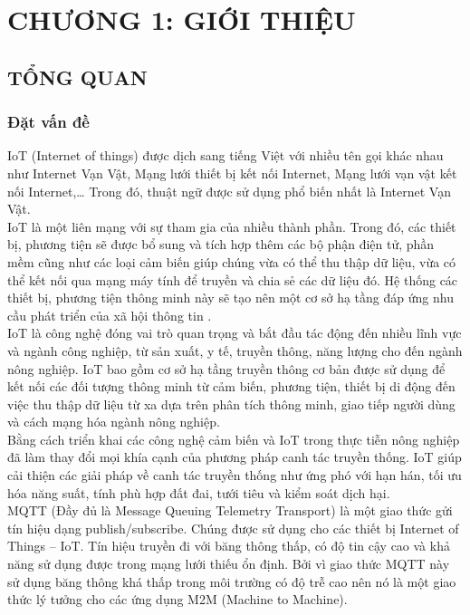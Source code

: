 \section*{CHƯƠNG 1: GIỚI THIỆU}
\setcounter{section}{1}
\subsection{TỔNG QUAN}
\subsubsection{Đặt vấn đề}
IoT (Internet of things) được dịch sang tiếng Việt với nhiều tên gọi khác nhau như Internet Vạn Vật, Mạng lưới thiết bị kết nối Internet, Mạng lưới vạn vật kết nối Internet,… Trong đó, thuật ngữ được sử dụng phổ biến nhất là Internet Vạn Vật.\\
\indent IoT là một liên mạng với sự tham gia của nhiều thành phần. Trong đó, các thiết bị, phương tiện sẽ được bổ sung và tích hợp thêm các bộ phận điện tử, phần mềm cũng như các loại cảm biến giúp chúng vừa có thể thu thập dữ liệu, vừa có thể kết nối qua mạng máy tính để truyền và chia sẻ các dữ liệu đó. Hệ thống các thiết bị, phương tiện thông minh này sẽ tạo nên một cơ sở hạ tầng đáp ứng nhu cầu phát triển của xã hội thông tin \cite{bor2016lora}.\\
\indent IoT là công nghệ đóng vai trò quan trọng và bắt đầu tác động đến nhiều lĩnh vực và ngành công nghiệp, từ sản xuất, y tế, truyền thông, năng lượng cho đến ngành nông nghiệp. IoT bao gồm cơ sở hạ tầng truyền thông cơ bản được sử dụng để kết nối các đối tượng thông minh từ cảm biến, phương tiện, thiết bị di động đến việc thu thập dữ liệu từ xa dựa trên phân tích thông minh, giao tiếp người dùng và cách mạng hóa ngành nông nghiệp.\\
\indent Bằng cách triển khai các công nghệ cảm biến và IoT trong thực tiễn nông nghiệp đã làm thay đổi mọi khía cạnh của phương pháp canh tác truyền thống. IoT giúp cải thiện các giải pháp về canh tác truyền thống như ứng phó với hạn hán, tối ưu hóa năng suất, tính phù hợp đất đai, tưới tiêu và kiểm soát dịch hại.\\
\indent MQTT (Đầy đủ là Message Queuing Telemetry Transport) là một giao thức gửi tín hiệu dạng publish/subscribe. Chúng được sử dụng cho các thiết bị Internet of Things – IoT. Tín hiệu truyền đi với băng thông thấp, có độ tin cậy cao và khả năng sử dụng được trong mạng lưới thiếu ổn định. Bởi vì giao thức MQTT này sử dụng băng thông khá thấp trong môi trường có độ trễ cao nên nó là một giao thức lý tưởng cho các ứng dụng M2M (Machine to Machine).\\
